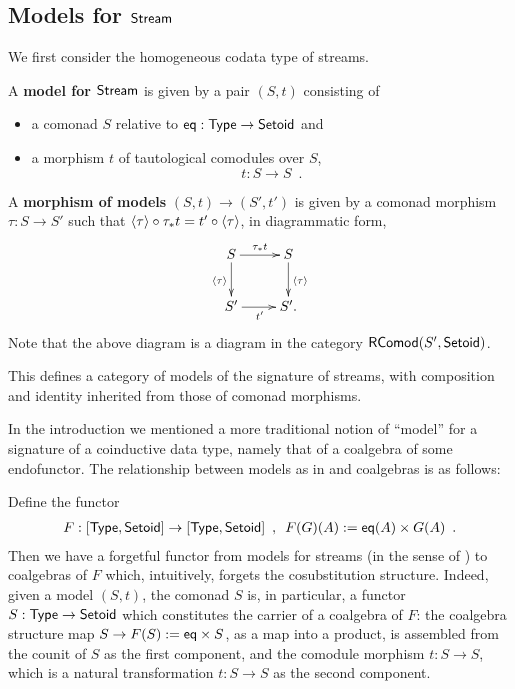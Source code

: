 \documentclass[a4paper,USenglish]{lipics}
\newcommand{\fat}[1]{\textbf{#1}}
\begin{document}
\subsection{Models for $\mathsf{Stream}$}

We first consider the homogeneous codata type of streams.

\begin{defn}
 \label{cat_stream}
  A \fat{model for $\mathsf{Stream}$} is given by a pair $(S,t)$ 
  consisting of
  \begin{itemize}
   \item a comonad $S$ relative to $\mathsf{eq} : \mathsf{Type} \to \mathsf{Setoid}$ and
   \item a morphism $t$ of tautological comodules over $S$, 
                   \[t : S \to S \enspace . \]
  \end{itemize}
  A \fat{morphism of models} $(S,t) \to (S',t')$ is given by a comonad morphism $\tau : S \to S'$ such that
     $ {\langle {\tau} \rangle} \circ {\tau_*t} = {t'} \circ {\ensuremath{\langle {\tau} \rangle}}$, in diagrammatic form,
 \[
  \begin{xy}
   \xymatrix{
                  S \ar[r]^{\tau_*t} \ar[d]_{\induced{\tau}} & S \ar[d]^{\induced{\tau}}\\
                  S' \ar[r]_{t'} & S' .
   }
  \end{xy}
 \]
  Note that the above diagram is a diagram in the category $\mathsf{RComod}(S', \mathsf{Setoid})$. 
  
  This defines a category of models of the signature of streams, with composition and identity inherited from those of comonad morphisms.

\end{defn}

In the introduction we mentioned a more traditional notion of \enquote{model} for a signature of a coinductive data type, 
namely that of a coalgebra of some endofunctor. The relationship between models as in  and coalgebras is as follows:

\begin{rem}\label{rem:coalg_stream}
 Define the functor
  \begin{align*}  F: [\mathsf{Type},\mathsf{Setoid}] \to [\mathsf{Type},\mathsf{Setoid}]  \enspace , \enspace
                      F(G)(A) := \mathsf{eq}(A) \times G(A) \enspace .
  \end{align*}
  Then we have a forgetful functor from models for streams (in the sense of ) to coalgebras of $F$ which, intuitively, forgets the cosubstitution structure.
  Indeed, given a model $(S,t)$, the comonad $S$ is, in particular, a functor $S:\mathsf{Type}\to\mathsf{Setoid}$ which constitutes the carrier of 
  a coalgebra of $F$: the coalgebra structure map $S \to F(S):=\mathsf{eq}\times S$, as a map into a product, 
  is assembled from the counit of $S$ as the first component, and the comodule morphism $t:S\to S$, which
  is a natural transformation $t : S \to S$ as the second component.
\end{rem}
  
\end{document}
